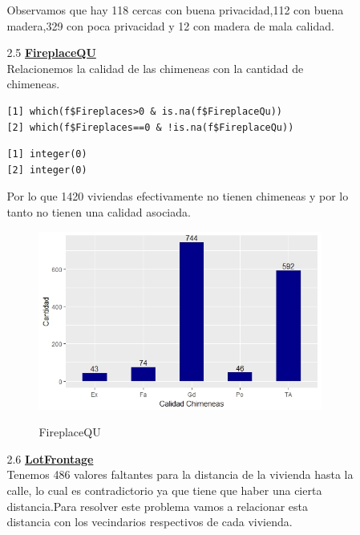 \documentclass{report}
\begin{document}
\begin{itemize}
\begin{itemize}
\begin{itemize}
Observamos que hay 118 cercas con buena privacidad,112 con buena madera,329 con poca privacidad y 12 con madera de mala calidad.

\newpage

\item[2.5] \textbf{\underline{FireplaceQU}}\\

Relacionemos la calidad de las chimeneas con la cantidad de chimeneas.\\

\begin{lstlisting}[frame=single]
[1] which(f$Fireplaces>0 & is.na(f$FireplaceQu))
[2] which(f$Fireplaces==0 & !is.na(f$FireplaceQu))
\end{lstlisting}

\begin{lstlisting}[frame=single]
[1] integer(0)
[2] integer(0)
\end{lstlisting}

Por lo que 1420 viviendas efectivamente no tienen chimeneas y por lo tanto no tienen una calidad asociada.\\

\begin{figure}[h]
	\centering
	\includegraphics[scale=0.8]{CChimeneas.JPEG}
	\label{p1}
	\caption{FireplaceQU}
\end{figure}

\item[2.6] \textbf{\underline{LotFrontage}}\\

Tenemos 486 valores faltantes para la distancia de la vivienda hasta la calle, lo cual es contradictorio ya que tiene que haber una cierta distancia.Para resolver este problema vamos a relacionar esta distancia con los vecindarios respectivos de cada vivienda.


\end{itemize}
\end{itemize}
\end{itemize}
\end{document}
